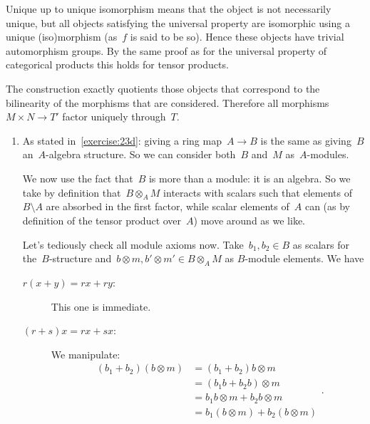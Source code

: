 \begin{exercise}
  Unique up to unique isomorphism means that the object is not necessarily unique, but all objects satisfying the universal property are isomorphic using a unique (iso)morphism (as~$f$ is said to be so). Hence these objects have trivial automorphism groups. By the same proof as for the universal property of categorical products this holds for tensor products.
\end{exercise}

\begin{exercise}
  The construction exactly quotients those objects that correspond to the bilinearity of the morphisms that are considered. Therefore all morphisms~$M\times N\to T'$ factor uniquely through~$T$.
\end{exercise}

\begin{exercise}
  \label{exercise:23k}
  \begin{enumerate}
    \item As stated in~\autoref{exercise:23d}: giving a ring map~$A\to B$ is the same as giving~$B$ an~$A$\nobreakdash-algebra structure. So we can consider both~$B$ and~$M$ as~$A$\nobreakdash-modules.

      We now use the fact that~$B$ is more than a module: it is an algebra. So we take by definition that~$B\otimes_A M$ interacts with scalars such that elements of~$B\setminus A$ are absorbed in the first factor, while scalar elements of~$A$ can (as by definition of the tensor product over~$A$) move around as we like.
      
      Let's tediously check all module axioms now. Take~$b_1,b_2\in B$ as scalars for the~$B$\nobreakdash-structure and~$b\otimes m,b'\otimes m'\in B\otimes_A M$ as $B$\nobreakdash-module elements. We have
      \begin{description}
        \item[$r(x+y)=rx+ry$:] This one is immediate.

        \item[$(r+s)x=rx+sx$:] We manipulate:
          \begin{equation}
            \begin{aligned}
              (b_1+b_2)(b\otimes m)&=(b_1+b_2)b\otimes m \\
              &=(b_1b+b_2b)\otimes m \\
              &=b_1b\otimes m+b_2b\otimes m \\
              &=b_1(b\otimes m)+b_2(b\otimes m)
            \end{aligned}.
          \end{equation}


\end{description}
\end{enumerate}
\end{exercise}
